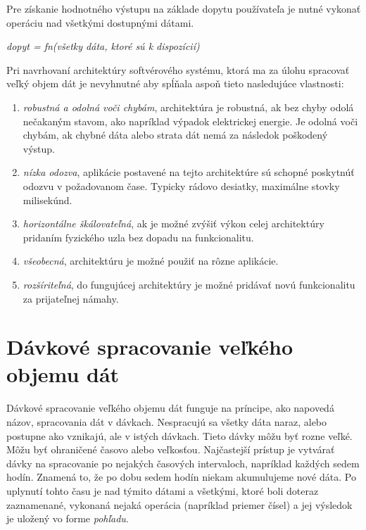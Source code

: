 Pre získanie hodnotného výstupu na základe dopytu používateľa je nutné vykonať operáciu nad všetkými dostupnými dátami\citep[s. 8-10]{marz2013big}.
\begin{center}
\textit{dopyt = fn(všetky dáta, ktoré sú k dispozícií)}
\end{center}

Pri navrhovaní architektúry softvérového systému, ktorá ma za úlohu spracovať veľký objem dát je nevyhnutné aby spĺňala aspoň tieto nasledujúce vlastnosti:
\begin{enumerate}
    \item \textit{robustná a odolná voči chybám}, architektúra je robustná, ak bez chyby odolá nečakaným stavom, ako napríklad výpadok elektrickej energie. Je odolná voči chybám, ak chybné dáta alebo strata dát nemá za následok poškodený výstup.
    \item \textit{nízka odozva}, aplikácie postavené na tejto architektúre sú schopné poskytnúť odozvu v požadovanom čase. Typicky rádovo desiatky, maximálne stovky milisekúnd.
    \item \textit{horizontálne škálovateľná}, ak je možné zvýšiť výkon celej architektúry pridaním fyzického uzla bez dopadu na funkcionalitu.
    \item \textit{všeobecná}, architektúru je možné použiť na rôzne aplikácie.
    \item \textit{rozšíriteľná}, do fungujúcej architektúry je možné pridávať novú funkcionalitu za prijateľnej námahy.
\end{enumerate}






\section{Dávkové spracovanie veľkého objemu dát}
Dávkové spracovanie veľkého objemu dát funguje na príncipe, ako napovedá názov, spracovania dát v dávkach. Nespracujú sa všetky dáta naraz, alebo postupne ako vznikajú, ale v istých dávkach. Tieto dávky môžu byť rozne veľké. Môžu byť ohraničené časovo alebo veľkosťou. Najčastejší prístup je vytvárať dávky na spracovanie po nejakých časových intervaloch, napríklad každých sedem hodín. Znamená to, že po dobu sedem hodín niekam akumulujeme nové dáta. Po uplynutí tohto času je nad týmito dátami a všetkými, ktoré boli doteraz zaznamenané, vykonaná nejaká operácia (napríklad priemer čísel) a jej výsledok je uložený vo forme \textit{pohľadu}. \\


